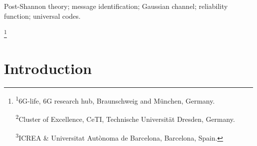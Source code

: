 \documentclass[10pt,conference]{IEEEtran}
\newcommand\blfootnote[1]{%
  \begingroup
  \renewcommand\thefootnote{}\footnote{#1}%
  \addtocounter{footnote}{-1}%
  \endgroup
}
\newcommand{\1}{\mathds{1}}
\newcommand{\cG}{\mathcal{G}}
\begin{document}
\begin{abstract}
Deterministic identification (DI) has emerged as a promising paradigm for large-scale and goal-oriented communication systems. Despite significant progress, a fundamental open problem has remained unresolved: a persistent gap between the best known lower and upper bounds on the DI capacity, as well as on the corresponding rate–reliability tradeoff bounds. 
In this paper, we finally close this gap for Gaussian channels $\cG$ by constructing an optimised code that achieves the known upper bound. This allows us to establish that the linearithmic capacity for deterministic identification is $\dot C_{\text{DI}}(\cG)=\frac12$. Furthermore, we analyse the rate–reliability tradeoff and show that the proposed scheme matches the known upper bounds to first order, thereby closing the existing gap in reliability performance for all admissible error decay regimes. Finally, we demonstrate the existence of an optimum universal code, which does not require knowledge of the channel parameters and yet achieves capacity.
\end{abstract}

\begin{IEEEkeywords}
Post-Shannon theory;
message identification;
Gaussian channel;
reliability function;
universal codes.
\end{IEEEkeywords}

\blfootnote{
{\textsuperscript{1}6G-life, 6G research hub,
Braunschweig and M\"unchen,
Germany.}\vspace{1pt}

{\textsuperscript{2}Cluster of Excellence, CeTI, Technische Universität Dresden, Germany.}\vspace{1pt}

{\textsuperscript{3}ICREA {\&} Universitat Aut\`onoma de Barcelona, Barcelona, Spain.}\vspace{1pt}
}







\section{Introduction}\label{sec:intro}
\end{document}
